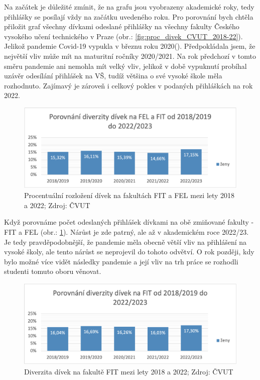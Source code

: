 \documentclass[12pt]{report}			%
\begin{document}
            Na začátek je důležité zmínit, že na grafu jsou vyobrazeny akademické roky, tedy přihlášky se posílají vždy na začátku uvedeného roku. Pro porovnání bych chtěla přiložit graf všechny dívkami odeslané přihlášky na všechny fakulty Českého vysokého učení technického v Praze (obr.: \ref{fig:proc_divek_CVUT_2018-22}). Jelikož pandemie Covid-19 vypukla v březnu roku 2020(\cite{Covid}). Předpokládala jsem, že největší vliv může mít na maturitní ročníky 2020/2021. Na rok předchozí v tomto směru pandemie ani nemohla mít velký vliv, jelikož v době vypuknutí probíhal uzávěr odesílání přihlášek na VŠ, tudíž většina o své vysoké škole měla rozhodnuto. Zajímavý je zároveň i celkový pokles v podaných přihláškách na rok 2022. \cite{CVUT} 
            \begin{figure}[h]
                \centering
                \includegraphics[width=16cm]{Maturitni Prace/images/proc_divek_FIT_FEL_2018-22.png}
                \caption[Vizualizace diverzity na FIT a FEL 2018/20]{Procentuální rozložení dívek na fakultách FIT a FEL mezi lety 2018 a 2022; Zdroj: ČVUT}
                \label{fig:proc_divek_FIT_FEL_2018-22}
            \end{figure}
            
            Když porovnáme počet odeslaných přihlášek dívkami na obě zmiňované fakulty - FIT a FEL (obr.: \ref{fig:proc_divek_FIT_FEL_2018-22}). Nárůst je zde patrný, ale až v akademickém roce 2022/23. Je tedy pravděpodobnější, že pandemie měla obecně větší vliv na přihlášení na vysoké školy, ale tento nárůst se neprojevil do tohoto odvětví. O rok později, kdy bylo možné více vidět následky pandemie a její vliv na trh práce se rozhodli studenti tomuto oboru věnovat. 
            
            \begin{figure}[h]
                \centering
                \includegraphics[width=16cm]{Maturitni Prace/images/proc_divek_FIT_2018-22.png}
                \caption[Vizualizace diverzity na FIT 2018/20]{Diverzita dívek na fakultě FIT mezi lety 2018 a 2022; Zdroj: ČVUT}
                \label{fig:proc_divek_FIT_2018-22}
            \end{figure}
            
\end{document}

